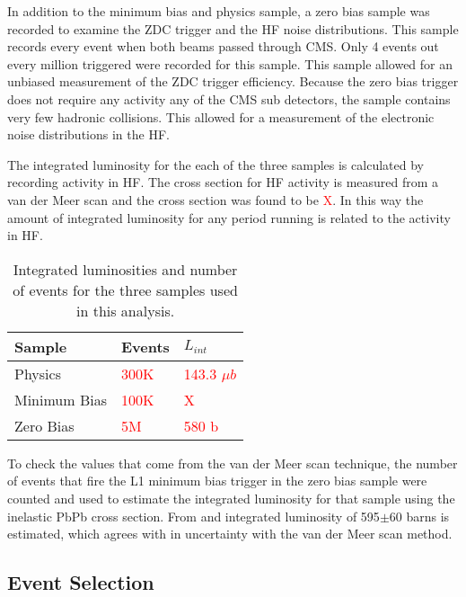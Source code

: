     In addition to the minimum bias and physics sample, a zero bias sample was 
      recorded to examine the ZDC trigger and the HF noise distributions. 
    This sample records every event when both beams passed through CMS. 
    Only 4 events out every million triggered were recorded for this sample. 
    This sample allowed for an unbiased measurement of the ZDC trigger 
      efficiency. 
    Because the zero bias trigger does not require any activity any of the
      CMS sub detectors, the sample contains very few hadronic collisions. 
    This allowed for a measurement of the electronic noise distributions in
      the HF.

    The integrated luminosity for the each of the three samples is calculated
      by recording activity in HF. 
    The cross section for HF activity is measured from a van der Meer scan and
      the cross section was found to be \textcolor{red}{X}.
    In this way the amount of integrated luminosity for any period running is
      related to the activity in HF. 
    \begin{table}
	    \centering
	    \begin{tabular}{|l|l|l|}
	      \hline Sample & Events & $L_{int}$ \\ \hline \hline
	      Physics & \textcolor{red}{300K} & \textcolor{red}{143.3 
	        $\mu$$b$} \\ \hline
	      Minimum Bias & \textcolor{red}{100K} & \textcolor{red}{X} \\ \hline
	      Zero Bias & \textcolor{red}{5M} & \textcolor{red}{580 b} \\ \hline \hline
	    \end{tabular}
	    \caption{Integrated luminosities and number of events for the three
	      samples used in this analysis.}
	    \label{tab:sampleLumiNevt}
    \end{table}
    To check the values that come from the van der Meer scan technique, the 
      number of events that fire the L1 minimum bias trigger in the zero bias
      sample were counted and used to estimate the integrated luminosity for 
      that sample using the inelastic PbPb cross section. 
    From and integrated luminosity of 595$\pm 60$ barns is estimated, which  
      agrees with in uncertainty with the van der Meer scan method. 

  \subsection{Event Selection}
    

